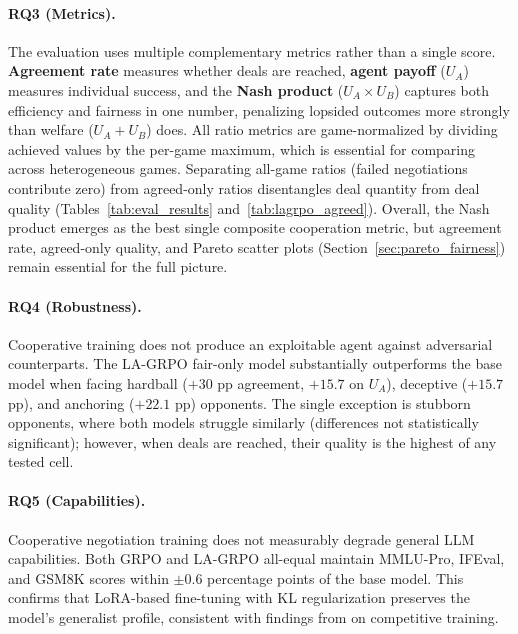 \documentclass[12pt,a4paper]{article}
\begin{document}
\paragraph{RQ3 (Metrics).} The evaluation uses multiple complementary metrics rather than a single score. \textbf{Agreement rate} measures whether deals are reached, \textbf{agent payoff} ($U_A$) measures individual success, and the \textbf{Nash product} ($U_A \times U_B$) captures both efficiency and fairness in one number, penalizing lopsided outcomes more strongly than welfare ($U_A + U_B$) does. All ratio metrics are game-normalized by dividing achieved values by the per-game maximum, which is essential for comparing across heterogeneous games. Separating all-game ratios (failed negotiations contribute zero) from agreed-only ratios disentangles deal quantity from deal quality (Tables~\ref{tab:eval_results} and~\ref{tab:lagrpo_agreed}). Overall, the Nash product emerges as the best single composite cooperation metric, but agreement rate, agreed-only quality, and Pareto scatter plots (Section~\ref{sec:pareto_fairness}) remain essential for the full picture.

\paragraph{RQ4 (Robustness).} Cooperative training does not produce an exploitable agent against adversarial counterparts. The LA-GRPO fair-only model substantially outperforms the base model when facing hardball ($+30$ pp agreement, $+15.7$ on $U_A$), deceptive ($+15.7$ pp), and anchoring ($+22.1$ pp) opponents. The single exception is stubborn opponents, where both models struggle similarly (differences not statistically significant); however, when deals are reached, their quality is the highest of any tested cell.

\paragraph{RQ5 (Capabilities).} Cooperative negotiation training does not measurably degrade general LLM capabilities. Both GRPO and LA-GRPO all-equal maintain MMLU-Pro, IFEval, and GSM8K scores within $\pm 0.6$ percentage points of the base model. This confirms that LoRA-based fine-tuning with KL regularization preserves the model's generalist profile, consistent with findings from \citet{franceschetti2025advantage} on competitive training.


\newpage
\end{document}
